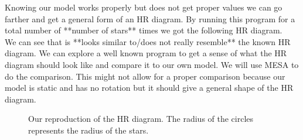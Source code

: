 \documentclass[10pt]{article}
\begin{document}
Knowing our model works properly but does not get proper values we can go farther and get a general form of an HR diagram. By running this program for a total number of **number of stars** times we got the following HR diagram. \\

We can see that is **looks similar to/does not really resemble** the known HR diagram. We can explore a well known program to get a sense of what the HR diagram should look like and compare it to our own model.  We will use MESA to do the comparison. This might not allow for a proper comparison because our model is static and has no rotation but it should give a general shape of the HR diagram. \\

\begin{figure}[p]
 \begin{centering}
  
  \caption{Our reproduction of the HR diagram. The radius of the circles represents the radius of the stars.}
 \end{centering}
\end{figure}
\end{document}
